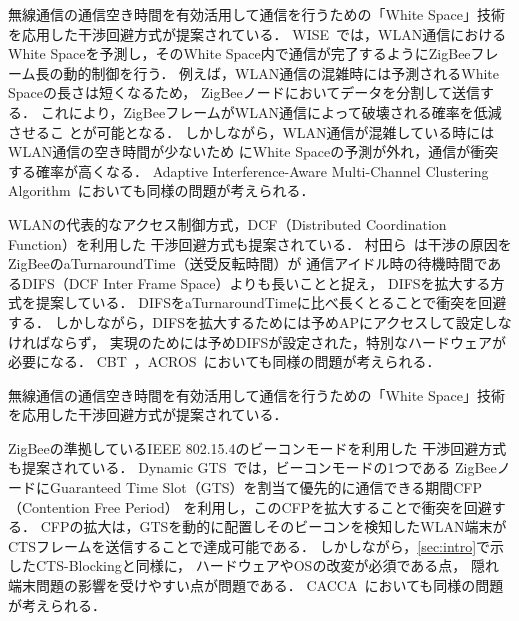 \documentclass[technicalreport]{ieicej}
\begin{document}
無線通信の通信空き時間を有効活用して通信を行うための「White Space」技術
を応用した干渉回避方式が提案されている．
WISE~\cite{Huang10:}では，WLAN通信におけるWhite Spaceを予測し，そのWhite
Space内で通信が完了するようにZigBeeフレーム長の動的制御を行う．
例えば，WLAN通信の混雑時には予測されるWhite Spaceの長さは短くなるため，
ZigBeeノードにおいてデータを分割して送信する．
これにより，ZigBeeフレームがWLAN通信によって破壊される確率を低減させるこ
とが可能となる．
しかしながら，WLAN通信が混雑している時にはWLAN通信の空き時間が少ないため
にWhite Spaceの予測が外れ，通信が衝突する確率が高くなる．
Adaptive Interference-Aware Multi-Channel
Clustering Algorithm~\cite{Kang07:}においても同様の問題が考えられる．

WLANの代表的なアクセス制御方式，DCF（Distributed Coordination Function）を利用した
干渉回避方式も提案されている．
村田ら~\cite{Murata14:}は干渉の原因をZigBeeのaTurnaroundTime（送受反転時間）が
通信アイドル時の待機時間であるDIFS（DCF Inter Frame Space）よりも長いことと捉え，
DIFSを拡大する方式を提案している．
DIFSをaTurnaroundTimeに比べ長くとることで衝突を回避する．
しかしながら，DIFSを拡大するためには予めAPにアクセスして設定しなければならず，
実現のためには予めDIFSが設定された，特別なハードウェアが必要になる．
CBT~\cite{Zhang11:}，ACROS~\cite{Shin10:}においても同様の問題が考えられる．

無線通信の通信空き時間を有効活用して通信を行うための「White Space」技術
を応用した干渉回避方式が提案されている．

ZigBeeの準拠しているIEEE 802.15.4のビーコンモードを利用した
干渉回避方式も提案されている．
Dynamic GTS~\cite{Huang09:}では，ビーコンモードの1つである
ZigBeeノードにGuaranteed Time Slot（GTS）を割当て優先的に通信できる期間CFP（Contention Free Period）
を利用し，このCFPを拡大することで衝突を回避する．
CFPの拡大は，GTSを動的に配置しそのビーコンを検知したWLAN端末が
CTSフレームを送信することで達成可能である．
しかしながら，\ref{sec:intro}で示したCTS-Blockingと同様に，
ハードウェアやOSの改変が必須である点，
隠れ端末問題の影響を受けやすい点が問題である．
CACCA~\cite{Tytgat12:}においても同様の問題が考えられる．

\end{document}

